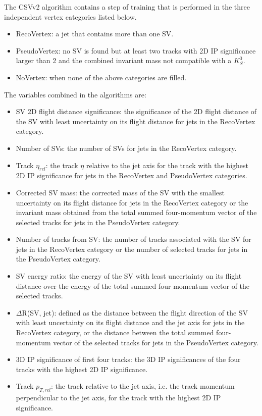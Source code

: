 The CSVv2 algorithm contains a step of training that is performed in the three independent vertex categories listed below.
\begin{itemize}
\item RecoVertex: a jet that contains more than one SV.
\item PseudoVertex: no SV is found but at least two tracks with 2D IP significance larger than 2 and the combined invariant mass not compatible with a $K_{S}^{0}$. 
\item NoVertex: when none of the above categories are filled. 
\end{itemize}
The variables combined in the algorithms are: 
\begin{itemize}
\item SV 2D flight distance significance: the significance of the 2D flight distance of the SV with least uncertainty on its flight distance for jets in the RecoVertex category.
\item Number of SVs: the number of SVs for jets in the RecoVertex category.
\item Track $\eta_{rel}$: the track $\eta$ relative to the jet axis for the track with the highest 2D IP significance for jets in the RecoVertex and PseudoVertex categories.
\item Corrected SV mass: the corrected mass of the SV with the smallest uncertainty on its flight distance for jets in the RecoVertex category or the invariant mass obtained from the total summed four-momentum vector of the selected tracks for jets in the PseudoVertex category.
\item Number of tracks from SV: the number of tracks associated with the SV for jets in the RecoVertex category or the number of selected tracks for jets in the PseudoVertex category.
\item SV energy ratio: the energy of the SV with least uncertainty on its flight distance over the energy of the total summed four momentum vector of the selected tracks.
\item $\Delta$R(SV, jet): defined as the distance between the flight direction of the SV with least uncertainty on its flight distance and the jet axis for jets in the RecoVertex category, or the distance between the total summed four-momentum vector of the selected tracks for jets in the PseudoVertex category.
\item 3D IP significance of first four tracks: the 3D IP significances of the four tracks with the highest 2D IP significance.
\item Track $p_{T,rel}$: the track \pt relative to the jet axis, i.e. the track momentum perpendicular to the jet axis, for the track with the highest 2D IP significance.

\end{itemize}

